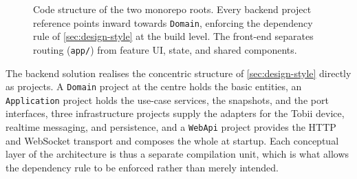 \begin{figure}[htbp]
{%
}
\caption[Code structure of the two monorepo roots.]{Code structure of the two monorepo roots. Every backend project reference points inward towards \texttt{Domain}, enforcing the dependency rule of \cref{sec:design-style} at the build level. The front-end separates routing (\texttt{app/}) from feature UI, state, and shared components.}
\label{fig:impl-structure}
\end{figure}

The backend solution realises the concentric structure of \cref{sec:design-style} directly as projects.
A \texttt{Domain} project at the centre holds the basic entities, an \texttt{Application} project holds the use-case services, the snapshots, and the port interfaces, three infrastructure projects supply the adapters for the Tobii device, realtime messaging, and persistence, and a \texttt{WebApi} project provides the HTTP and WebSocket transport and composes the whole at startup.
Each conceptual layer of the architecture is thus a separate compilation unit, which is what allows the dependency rule to be enforced rather than merely intended.

